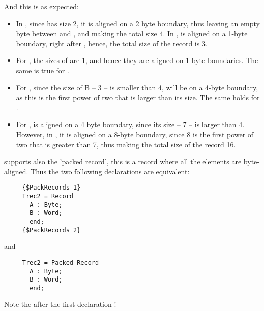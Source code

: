 And this is as expected:
\begin{itemize}
\item In , since  has size 2, it is
aligned on a 2 byte boundary, thus leaving an empty byte between 
and , and making the total size 4. In ,  is aligned
on a 1-byte boundary, right after , hence, the total size of the
record is 3.
\item For , the sizes of  are 1, and hence they are aligned on 1
byte boundaries. The same is true for .
\item For , since the size of B -- 3 -- is smaller than 4,  will
be on a  4-byte boundary, as this is the first power of two that is
larger than its size. The same holds for .
\item For ,  is aligned on a 4 byte boundary, since its size --
7 -- is larger than 4. However, in , it is aligned on a 8-byte
boundary, since 8 is the first power of two that is greater than 7, thus
making the total size of the record 16.
\end{itemize}
\fpc supports also the 'packed record', this is a record where all the
elements are byte-aligned. Thus the two following declarations are equivalent:
\begin{verbatim}
     {$PackRecords 1}
     Trec2 = Record
       A : Byte;
       B : Word;
       end;
     {$PackRecords 2}
\end{verbatim}
and
\begin{verbatim}
     Trec2 = Packed Record
       A : Byte;
       B : Word;
       end;
\end{verbatim}
Note the  after the first declaration !
%
